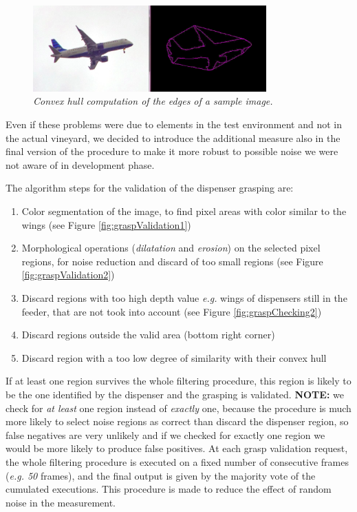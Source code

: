 \begin{description}
\begin{figure}
	\centering
	\includegraphics[width=0.8\textwidth]{Images/arm/convexHullExampleClean.png}
	\caption{\textit{Convex hull computation of the edges of a sample image.}}
	\label{fig:convexHullExample}
\end{figure}

Even if these problems were due to elements in the test environment and not in the actual vineyard, we decided to introduce the additional measure also in the final version of the procedure to make it more robust to possible noise we were not aware of in development phase.

The algorithm steps for the validation of the dispenser grasping  are:
	\begin{enumerate}
		\item Color segmentation of the image, to find pixel areas with color similar to the wings (see Figure \ref{fig:graspValidation1})
		\item Morphological operations (\textit{dilatation} and \textit{erosion}) on the selected pixel regions, for noise reduction and discard of too small regions (see Figure \ref{fig:graspValidation2})
		\item Discard regions with too high depth value \textit{e.g.} wings of dispensers still in the feeder, that are not took into account (see Figure \ref{fig:graspChecking2})
		\item Discard regions outside the valid area (bottom right corner)
		\item Discard region with a too low degree of similarity with their convex hull
	\end{enumerate}
If at least one region survives the whole filtering procedure, this region is likely to be the one identified by the dispenser and the grasping is validated. \textbf{NOTE:} we check for \textit{at least} one region instead of \textit{exactly} one, because the procedure is much more likely to select noise regions as correct than discard the dispenser region, so false negatives are very unlikely and if we checked for exactly one region we would be more likely to produce false positives.
At each grasp validation request, the whole filtering procedure is executed on a fixed number of consecutive frames (\textit{e.g. 50} frames), and the final output is given by the majority vote of the cumulated executions. This procedure is made to reduce the effect of random noise in the measurement.


\end{description}
